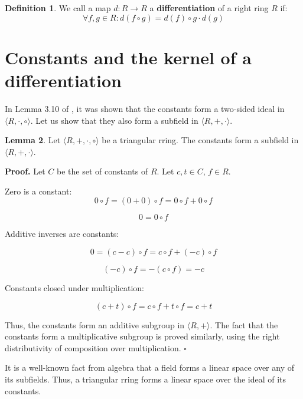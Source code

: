 \documentclass[12pt]{article}
\theoremstyle{definition}
\newtheorem{definition}{Definition}[section]
\newtheorem{lemma}[definition]{Lemma}
\begin{document}
\vspace{5pt}
\begin{definition}  We call a map $d: R \to R$ a \textbf{differentiation} 
    of a right ring $R$ if: 
    \[
    \forall f, g \in R: d(f \circ g) = d(f)\circ g \cdot d(g)
    \]
\end{definition}




\section{Constants and the kernel of a differentiation}

In Lemma 3.10 of \cite{umerov2025}, it was shown that the constants form a two-sided ideal in $\langle R, \cdot, \circ \rangle$. 
Let us show that they also form a subfield in $\langle R, +, \cdot \rangle$.

\vspace{10pt}
\begin{lemma} Let $\langle R, +, \cdot, \circ \rangle$ be a triangular rring. 
    The constants form a subfield in $\langle R, +, \cdot \rangle$.

\vspace{10pt}
\textbf{Proof.} Let $C$ be the set of constants of $R$. Let $c, t \in C$, $f \in R$.

\vspace{5pt}
Zero is a constant:
\[
0 \circ f = (0 + 0) \circ f = 0 \circ f + 0 \circ f
\]

\[
0 = 0 \circ f
\]

\vspace{5pt}
Additive inverses are constants:

\[
0 = (c - c) \circ f = c \circ f + (-c) \circ f
\]

\[
(-c) \circ f = -(c \circ f) = -c
\]

\vspace{5pt}
Constants closed under multiplication:

\[
(c + t) \circ f = c \circ f + t \circ f = c + t
\]

Thus, the constants form an additive subgroup in $\langle R, + \rangle$. The fact that the constants form a 
multiplicative subgroup is proved similarly, using the right distributivity of composition over multiplication. $\square$
\end{lemma}

\vspace{10pt}
It is a well-known fact from algebra that a field forms a linear space over any of its subfields. 
Thus, a triangular rring forms a linear space over the ideal of its constants.
\end{document}
